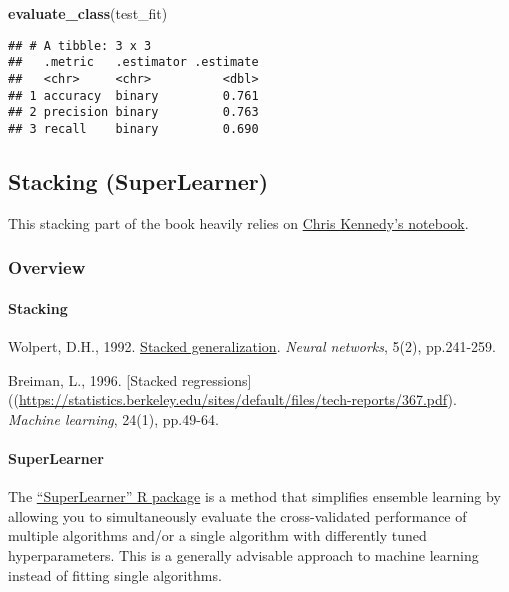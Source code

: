 \documentclass[
]{book}
\newenvironment{Shaded}{\begin{snugshade}}{\end{snugshade}}
\newcommand{\KeywordTok}[1]{\textcolor[rgb]{0.13,0.29,0.53}{\textbf{#1}}}
\newcommand{\NormalTok}[1]{#1}
\begin{document}
\begin{Shaded}
\begin{Highlighting}[]
\KeywordTok{evaluate\_class}\NormalTok{(test\_fit)}
\end{Highlighting}
\end{Shaded}

\begin{verbatim}
## # A tibble: 3 x 3
##   .metric   .estimator .estimate
##   <chr>     <chr>          <dbl>
## 1 accuracy  binary         0.761
## 2 precision binary         0.763
## 3 recall    binary         0.690
\end{verbatim}

\hypertarget{stacking-superlearner}{%
\subsection{Stacking (SuperLearner)}\label{stacking-superlearner}}

This stacking part of the book heavily relies on \href{https://github.com/dlab-berkeley/Machine-Learning-in-R/blob/master/07-ensembles.Rmd}{Chris Kennedy's notebook}.

\hypertarget{overview}{%
\subsubsection{Overview}\label{overview}}

\hypertarget{stacking}{%
\paragraph{Stacking}\label{stacking}}

Wolpert, D.H., 1992. \href{http://citeseerx.ist.psu.edu/viewdoc/summary?doi=10.1.1.56.1533}{Stacked generalization}. \emph{Neural networks}, 5(2), pp.241-259.

Breiman, L., 1996. {[}Stacked regressions{]}((\url{https://statistics.berkeley.edu/sites/default/files/tech-reports/367.pdf}). \emph{Machine learning}, 24(1), pp.49-64.

\hypertarget{superlearner}{%
\paragraph{SuperLearner}\label{superlearner}}

The \href{https://cran.r-project.org/web/packages/SuperLearner/index.html}{``SuperLearner'' R package} is a method that simplifies ensemble learning by allowing you to simultaneously evaluate the cross-validated performance of multiple algorithms and/or a single algorithm with differently tuned hyperparameters. This is a generally advisable approach to machine learning instead of fitting single algorithms.
\end{document}

